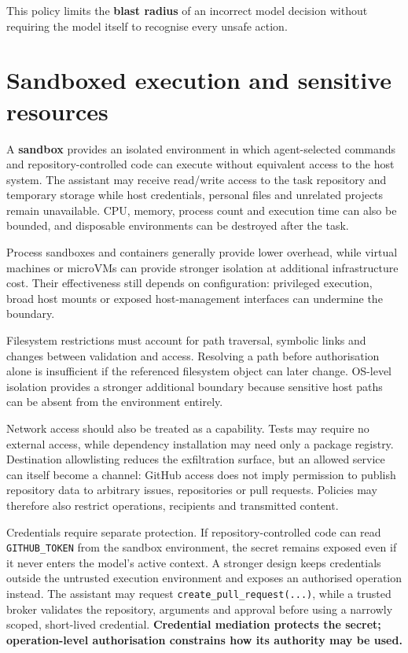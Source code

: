 This policy limits the \textbf{blast radius} of an incorrect model decision without requiring the model itself to recognise every unsafe action.

\section{Sandboxed execution and sensitive resources}

A \textbf{sandbox} provides an isolated environment in which agent-selected commands and repository-controlled code can execute without equivalent access to the host system. The assistant may receive read/write access to the task repository and temporary storage while host credentials, personal files and unrelated projects remain unavailable. CPU, memory, process count and execution time can also be bounded, and disposable environments can be destroyed after the task.

Process sandboxes and containers generally provide lower overhead, while virtual machines or microVMs can provide stronger isolation at additional infrastructure cost. Their effectiveness still depends on configuration: privileged execution, broad host mounts or exposed host-management interfaces can undermine the boundary.

Filesystem restrictions must account for path traversal, symbolic links and changes between validation and access. Resolving a path before authorisation alone is insufficient if the referenced filesystem object can later change. OS-level isolation provides a stronger additional boundary because sensitive host paths can be absent from the environment entirely.

Network access should also be treated as a capability. Tests may require no external access, while dependency installation may need only a package registry. Destination allowlisting reduces the exfiltration surface, but an allowed service can itself become a channel: GitHub access does not imply permission to publish repository data to arbitrary issues, repositories or pull requests. Policies may therefore also restrict operations, recipients and transmitted content.

Credentials require separate protection. If repository-controlled code can read \texttt{GITHUB\_TOKEN} from the sandbox environment, the secret remains exposed even if it never enters the model's active context. A stronger design keeps credentials outside the untrusted execution environment and exposes an authorised operation instead. The assistant may request \texttt{create\_pull\_request(...)}, while a trusted broker validates the repository, arguments and approval before using a narrowly scoped, short-lived credential. \textbf{Credential mediation protects the secret; operation-level authorisation constrains how its authority may be used.}

